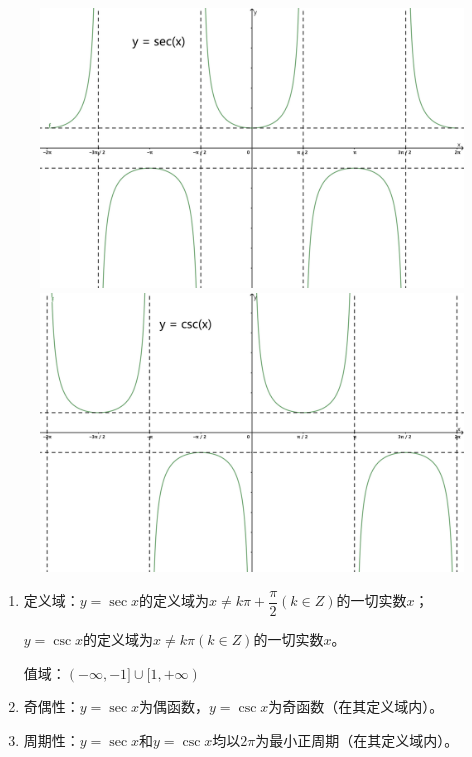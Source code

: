 \begin{figure}[H]
\centering
\begin{minipage}{0.4\linewidth}
    \centerline{\includegraphics[width=\textwidth]{figure/sec_plot.png}}
    \caption{} \label{sec}
\end{minipage}
    \qquad
\begin{minipage}{0.4\linewidth}
    \centerline{\includegraphics[width=\textwidth]{figure/csc_plot.png}}
    \caption{} \label{csc}
\end{minipage}
\end{figure}

\begin{note}
    \begin{enumerate}
        \item 定义域：$y=\sec x$的定义域为$x\neq k\pi+\dfrac{\pi}{2}(k\in Z)$的一切实数$x$；
        \vspace{2mm}

        $y=\csc x$的定义域为$x\neq k\pi(k\in Z)$的一切实数$x$。

        值域：$(-\infty,-1]\cup [1,+\infty)$

        \item 奇偶性：$y=\sec x$为偶函数，$y=\csc x$为奇函数（在其定义域内）。

        \item 周期性：$y=\sec x$和$y=\csc x$均以$2\pi$为最小正周期（在其定义域内）。
    \end{enumerate}
\end{note}

